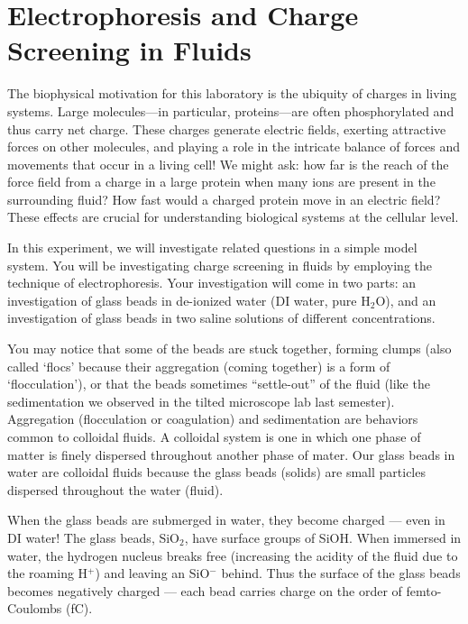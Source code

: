 \chapter{Electrophoresis and Charge Screening in Fluids}
\thispagestyle{fancy}
%
The biophysical motivation for this laboratory is the ubiquity of charges in living systems.
Large molecules—in particular, proteins—are often phosphorylated and thus carry net charge.
These charges generate electric fields, exerting attractive forces on other molecules, and playing a role in the intricate balance of forces and movements that occur in a living cell!
We might ask: how far is the reach of the force field from a charge in a large protein when many ions are present in the surrounding fluid?
How fast would a charged protein move in an electric field?
These effects are crucial for understanding biological systems at the cellular level.
\par 
In this experiment, we will investigate related questions in a simple model system.
You will be investigating charge screening in fluids by employing the technique of electrophoresis.
Your investigation will come in two parts: an investigation of glass beads in de-ionized water (DI water, pure H$_{2}$O), and an investigation of glass beads in two saline solutions of different concentrations.
\par 
You may notice that some of the beads are stuck together, forming clumps (also called `flocs' because their aggregation (coming together) is a form of `flocculation'), or that the beads sometimes ``settle-out'' of the fluid (like the sedimentation we observed in the tilted microscope lab last semester). 
Aggregation (flocculation or coagulation) and sedimentation are behaviors common to colloidal fluids. 
A colloidal system is one in which one phase of matter is finely dispersed throughout another phase of mater. 
Our glass beads in water are colloidal fluids because the glass beads (solids) are small particles dispersed throughout the water (fluid). 
\par 
When the glass beads are submerged in water, they become charged — even in DI water! 
The glass beads, SiO$_{2}$, have surface groups of SiOH. 
When immersed in water, the hydrogen nucleus breaks free (increasing the acidity of the fluid due to the roaming H$^{+}$) and leaving an SiO$^{-}$ behind. 
Thus the surface of the glass beads becomes negatively charged — each bead carries charge on the order of femto-Coulombs (fC). 
